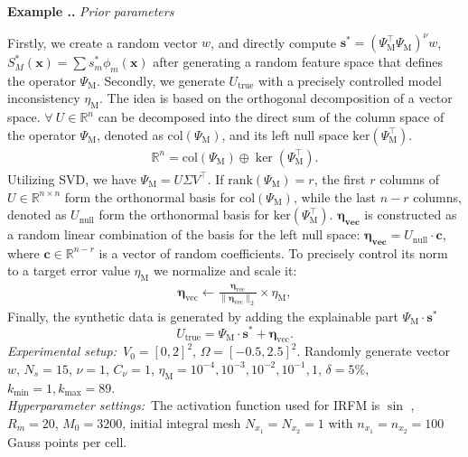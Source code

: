 \documentclass{article}
\theoremstyle{plain}
\theoremstyle{definition}
\newcounter{example}[section]         %
\renewcommand{\theexample}{\thesection.\arabic{example}}
\newenvironment{example}[1][]{
    \refstepcounter{example}%
    \par\noindent\textbf{Example \theexample.} #1 \par
}{\par}
\begin{document}
{\begin{example}[\emph{Prior parameters}]
Firstly, we create a random vector $w$, and directly compute $\boldsymbol{s}^{*}=(\Psi_\text{M}^\top\Psi_\text{M})^{\nu} w$, $S^*_M(\boldsymbol{x})=\sum s_m^* \phi_m(\boldsymbol{x})$ after generating a random feature space that defines the operator $\Psi_\text{M}$. 
Secondly, we generate $U_{\text{true}}$ with a precisely controlled model inconsistency $\eta_\text{M}$.
The idea is based on the orthogonal decomposition of a vector space. $\forall  \ U\in\mathbb{R}^n$ can be decomposed into the direct sum of the column space of the operator $\Psi_\text{M}$, denoted as $\text{col}(\Psi_\text{M})$, and its left null space $\text{ker}(\Psi_\text{M}^\top)$.
\begin{align}
\mathbb{R}^n = \text{col}(\Psi_\text{M}) \oplus \ker(\Psi_\text{M}^\top).
\end{align}
Utilizing SVD, we have $\Psi_\text{M}=U\Sigma V^\top$. If $\text{rank}(\Psi_\text{M})=r$, the first $r$ columns of  $U\in \mathbb{R}^{n\times n}$ form the orthonormal basis for $\text{col}(\Psi_\text{M})$, while the last $n-r$ columns, denoted as $U_{\text{null}}$ form the orthonormal basis for $\text{ker}(\Psi_\text{M}^\top)$. $\boldsymbol{\eta_{\text{vec}}}$ is constructed as a random linear combination of the basis for the left null space: $\boldsymbol{\eta_{\text{vec}}}=U_{\text{null}} \cdot \boldsymbol{c}$, where $\mathbf{c}\in \mathbb{R}^{n-r}$ is a vector of random coefficients. To precisely control its norm to a target error value $\eta_\text{M}$ we normalize and scale it:
 \begin{align}
\boldsymbol{\eta}_{\text{vec}} \leftarrow \frac{\boldsymbol{\eta}_{\text{vec}}}{\|\boldsymbol{\eta}_{\text{vec}}\|_2} \times \eta_\text{M},
\end{align}
Finally, the synthetic data is generated by adding the explainable part $\Psi_\text{M} \cdot \boldsymbol{s}^{*}$
$$
U_{\text{true}}=\Psi_\text{M} \cdot \boldsymbol{s}^* + \boldsymbol{\eta}_{\text{vec}}.
$$
\noindent\emph{Experimental setup:}\ $V_0=[0, 2]^2$,  $\Omega=[-0.5,2.5]^2$. Randomly generate vector $w$, $N_s=15$, $\nu=1$, $C_{\nu}=1$, $\eta_{\text{M}} = 10^{-4}, 10^{-3}, 10^{-2}, 10^{-1}, 1$, $\delta=5\%$, $k_{\text{min}}=1, k_{\text{max}}=89$.\\ 
\noindent\emph{Hyperparameter settings:}\ The activation function used for IRFM is $\sin$ , $R_m=20$, $M_0=3200$,  initial integral mesh $ {N_{x_1}}= {N_{x_2}}=1$  with  $ {n_{x_1}}= {n_{x_2}}=100$ Gauss points per cell. \\


\end{example}}
\end{document}
